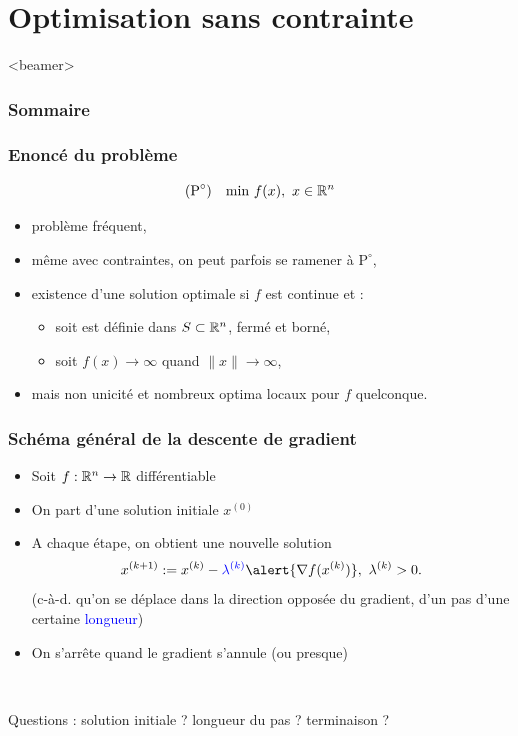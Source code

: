 \documentclass{beamer}
\newcommand{\R}{{\ensuremath\mathbb{R}}}
\begin{document}
\section{Optimisation sans contrainte}

\begin{frame}<beamer>
  \frametitle{Sommaire}
  \tableofcontents[currentsection]
\end{frame}

\begin{frame}
  \frametitle{Enoncé du problème}

  \[
  (\text{P}^\circ) \quad
    \text{min} \ f(x), \ x \in \R^n
  \]

  \begin{itemize}
  \item problème fréquent,
  \item même avec contraintes, on peut parfois se ramener à $\text{P}^\circ$,
  \item existence d'une solution optimale si $f$ est continue et :
    \begin{itemize}
    \item soit est définie dans $S \subset \R^n$, fermé et borné,
    \item soit $f(x) \rightarrow \infty$ quand $\|x\| \rightarrow \infty$, 
    \end{itemize}
  \item mais non unicité et nombreux optima locaux pour $f$ quelconque.
  \end{itemize}
  
\end{frame}

\begin{frame}
  \frametitle{Schéma général de la descente de gradient}

  \begin{itemize}
  \item Soit $f : \R^n \rightarrow \R$ différentiable
  \item On part d'une solution initiale $x^{(0)}$
  \item A chaque étape, on obtient une nouvelle solution
    \[ x^{(k+1)} := x^{(k)} - \textcolor{blue}{\lambda^{(k)}} \alert{{\nabla f}(x^{(k)})}, \ \lambda^{(k)} > 0. \]
    (c-à-d. qu'on se déplace dans la direction opposée du \alert{gradient},
    d'un pas d'une certaine \textcolor{blue}{longueur})
  \item On s'arrête quand le gradient s'annule (ou presque)
  \end{itemize}

  ~

  Questions : 
  solution initiale ?
  longueur du pas ?
  terminaison ?
\end{frame}
\end{document}
